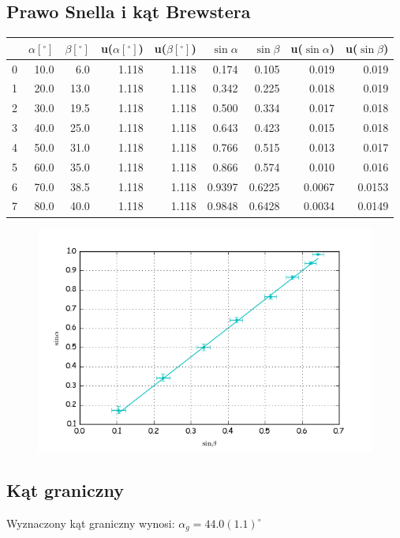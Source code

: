 \documentclass[a4paper,10pt]{article}
\begin{document}
\subsection{Prawo Snella i kąt Brewstera}

\begin{tabular}{lrrrrrrrr}
\toprule
{}&$\alpha[^\circ]$&$\beta[^\circ]$&u($\alpha[^\circ]$)&u($\beta[^\circ]$)&$\sin{\alpha}$&$\sin{\beta}$&u($\sin{\alpha}$)&u($\sin{\beta}$) \\
\midrule
0 & 10.0 &  6.0 & 1.118 & 1.118 & 0.174 & 0.105 & 0.019 & 0.019 \\
1 & 20.0 & 13.0 & 1.118 & 1.118 & 0.342 & 0.225 & 0.018 & 0.019 \\
2 & 30.0 & 19.5 & 1.118 & 1.118 & 0.500 & 0.334 & 0.017 & 0.018 \\
3 & 40.0 & 25.0 & 1.118 & 1.118 & 0.643 & 0.423 & 0.015 & 0.018 \\
4 & 50.0 & 31.0 & 1.118 & 1.118 & 0.766 & 0.515 & 0.013 & 0.017 \\
5 & 60.0 & 35.0 & 1.118 & 1.118 & 0.866 & 0.574 & 0.010 & 0.016 \\
6 & 70.0 & 38.5 & 1.118 & 1.118 & 0.9397 & 0.6225 & 0.0067 & 0.0153 \\
7 & 80.0 & 40.0 & 1.118 & 1.118 & 0.9848 & 0.6428 & 0.0034 & 0.0149 \\
\bottomrule
\end{tabular}

\begin{figure}[H]
  \includegraphics{./snella.png}
  \caption{}
  \label{}
\end{figure}

\subsection{Kąt graniczny}
Wyznaczony kąt graniczny wynosi: $\alpha_g = 44.0(1.1)^\circ$
\end{document}
